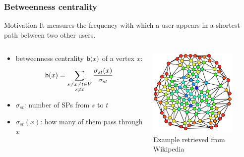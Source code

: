\begin{frame}
  \frametitle{Betweenness centrality}
  \begin{block}{Motivation}
    It measures the frequency with which a user appears in a shortest path
    between two other users.
  \end{block}
  \begin{columns}[c]
    \begin{column}{55mm}
      \begin{definition}
        \begin{itemize}
          \item betweenness centrality $\mathsf{b}(x)$ of a vertex $x$:
            \[
              \mathsf{b}(x)=\sum_{\substack{s\neq x\neq t \in V\\s\neq t}}
              \frac{\sigma_{st}(x)}{\sigma_{st}}
            \]
          \item $\sigma_{st}$:  number of SPs from $s$ to $t$
          \item $\sigma_{st}(x)$: how many of them pass through $x$
        \end{itemize}
      \end{definition}
    \end{column}
    \begin{column}{45mm}
      \includegraphics[width=42mm]{imgs/Graph_betweenness.pdf}
      \\ \hspace{10mm} \tiny{Example retrieved from  Wikipedia}
    \end{column}
  \end{columns}
\end{frame}


